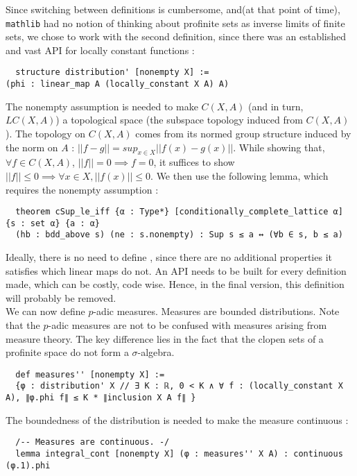 \documentclass[11pt]{article}
\begin{document}
Since switching between definitions is cumbersome, and(at that point of time), \texttt{mathlib}
had no notion of thinking about profinite sets as inverse limits of finite sets, we chose to work
with the second definition, since there was an established and vast API for locally constant
functions :
\begin{lstlisting}
  structure distribution' [nonempty X] :=
(phi : linear_map A (locally_constant X A) A)
\end{lstlisting}
The nonempty assumption is needed to make $C(X,A)$ (and in turn, $LC(X, A)$)
a topological space (the subspace topology induced from $C(X, A)$). The topology on $C(X, A)$
comes from its normed group structure induced by the norm on $A$ :
$|| f - g || = sup_{x \in X} || f(x) - g(x) ||$. While showing that, $\forall f \in C(X, A)$,
$||f|| = 0 \implies f = 0$, it suffices to show $||f|| \le 0 \implies \forall x \in X,
||f(x)|| \le 0$. We then use the following lemma, which requires the nonempty assumption :
\begin{lstlisting}
  theorem cSup_le_iff {α : Type*} [conditionally_complete_lattice α] {s : set α} {a : α}
  (hb : bdd_above s) (ne : s.nonempty) : Sup s ≤ a ↔ (∀b ∈ s, b ≤ a)
\end{lstlisting}

Ideally, there is no need to define , since there are no additional
properties it satisfies which linear maps do not. An API needs to be built for every definition
made, which can be costly, code wise. Hence, in the final version, this definition will probably be
removed. \\

We can now define $p$-adic measures. Measures are bounded distributions. Note that the $p$-adic measures
are not to be confused with measures arising from measure theory. The key difference lies in the
fact that the clopen sets of a profinite space do not form a $\sigma$-algebra. \\

\begin{lstlisting}
  def measures'' [nonempty X] :=
  {φ : distribution' X // ∃ K : ℝ, 0 < K ∧ ∀ f : (locally_constant X A), ∥φ.phi f∥ ≤ K * ∥inclusion X A f∥ }
\end{lstlisting}

The boundedness of the distribution is needed to make the measure continuous :
\begin{lstlisting}
  /-- Measures are continuous. -/
  lemma integral_cont [nonempty X] (φ : measures'' X A) : continuous (φ.1).phi
\end{lstlisting}
\end{document}
